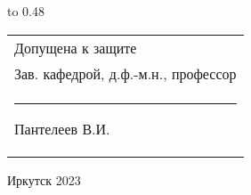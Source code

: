 \vspace{0.8cm}

{
	\noindent\hbox to 0.48\textwidth {%
		\mbox{ } \hfil} %
	\begin{tabular}[t]{l}
		Допущена к защите\\
		Зав. кафедрой, д.ф.-м.н., профессор \\
		\rule{2.7cm}{0.5pt} Пантелеев В.И.
	\end{tabular}		
}

\vspace{0.8cm}

\vfill 
\noindent
\begin{minipage}{\textwidth}
	\centering	Иркутск 2023
\end{minipage}